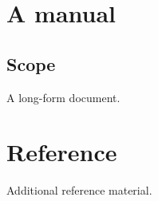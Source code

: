 \documentclass[11pt,a4paper,oneside]{memoir}
\begin{document}
\frontmatter\tableofcontents
\mainmatter\chapter{A manual}\section{Scope}A long-form document.
\appendix\chapter{Reference}Additional reference material.
\end{document}

